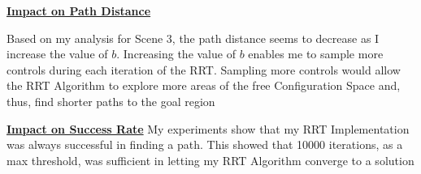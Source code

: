 \documentclass{article}
\begin{document}
\textbf{\underline{Impact on Path Distance}} \newline

Based on my analysis for Scene 3, the path distance seems to decrease as I increase the value of $b$. Increasing the value of $b$ enables me to sample more controls during each iteration of the RRT. Sampling more controls would allow the RRT Algorithm to explore more areas of the free Configuration Space and, thus, find shorter paths to the goal region \newline 

\textbf{\underline{Impact on Success Rate}} \newline
My experiments show that my RRT Implementation was always successful in finding a path. This showed that 10000 iterations, as a max threshold, was sufficient in letting my RRT Algorithm converge to a solution
\end{document}
